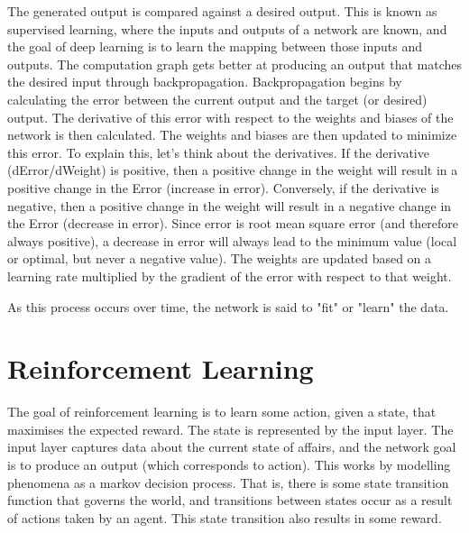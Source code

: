 The generated output is compared against a desired output. This is known as supervised learning, where the inputs and outputs of a network are known, and the goal of deep learning is to learn the mapping between those inputs and outputs. The computation graph gets better at producing an output that matches the desired input through backpropagation. Backpropagation begins by calculating the error between the current output and the target (or desired) output. The derivative of this error with respect to the weights and biases of the network is then calculated. The weights and biases are then updated to minimize this error. To explain this, let's think about the derivatives. If the derivative (dError/dWeight) is positive, then a positive change in the weight will result in a positive change in the Error (increase in error). Conversely, if the derivative is negative, then a positive change in the weight will result in a negative change in the Error (decrease in error). Since error is root mean square error (and therefore always positive), a decrease in error will always lead to the minimum value (local or optimal, but never a negative value). The weights are updated based on a learning rate multiplied by the gradient of the error with respect to that weight. 

As this process occurs over time, the network is said to "fit" or "learn" the data.

\section{Reinforcement Learning}

The goal of reinforcement learning is to learn some action, given a state, that maximises the expected reward. The state is represented by the input layer. The input layer captures data about the current state of affairs, and the network goal is to produce an output (which corresponds to action). This works by modelling phenomena as a markov decision process. That is, there is some state transition function that governs the world, and transitions between states occur as a result of actions taken by an agent. This state transition also results in some reward.

